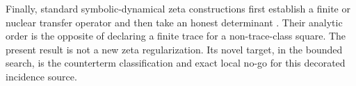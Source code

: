Finally, standard symbolic-dynamical zeta constructions first establish a
finite or nuclear transfer operator and then take an honest determinant
\citep{BowenLanford1970,Ruelle1976}.  Their analytic order is the opposite of
declaring a finite trace for a non-trace-class square.  The present result is
not a new zeta regularization.  Its novel target, in the bounded search, is
the counterterm classification and exact local no-go for this decorated
incidence source.
